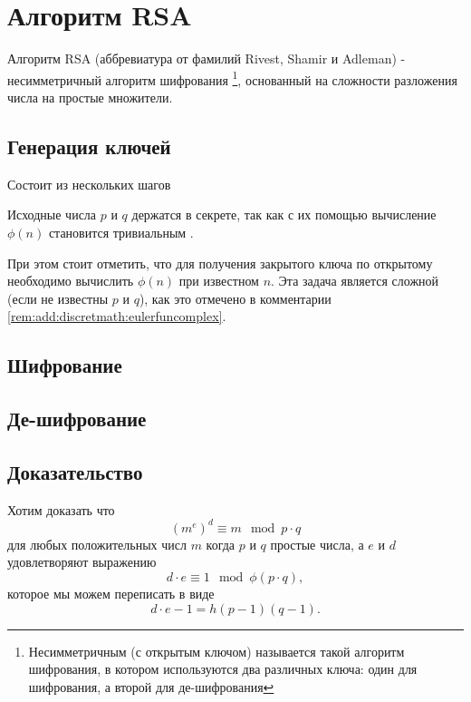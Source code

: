 \section{Алгоритм RSA}
\label{AddRSA}
Алгоритм RSA (аббревиатура от фамилий Rivest, Shamir и Adleman) - 
несимметричный алгоритм шифрования
\footnote{Несимметричным (с открытым ключом) называется такой алгоритм
  шифрования, в 
  котором используются два различных ключа: один для шифрования, а
  второй для де-шифрования},  
основанный на сложности разложения числа на простые множители.  

\subsection{Генерация ключей}
Состоит из нескольких шагов


Исходные числа $p$ и $q$ держатся в секрете, так как с их помощью
вычисление $\phi(n)$ становится тривиальным .

При этом стоит отметить, что для получения закрытого ключа по открытому
необходимо вычислить $\phi(n)$ при известном $n$. Эта задача является
сложной (если не известны $p$ и $q$), как это отмечено в комментарии
\ref{rem:add:discretmath:eulerfuncomplex}. 



\subsection{Шифрование}


\subsection{Де-шифрование}


\subsection{Доказательство}
Хотим доказать что 
\[
\left(m^e\right)^d \equiv m \mod{p \cdot q}
\]
для любых положительных числ $m$ когда $p$ и $q$ простые числа, а $e$
и $d$ удовлетворяют выражению
\[
d \cdot e \equiv 1 \mod{\phi\left(p \cdot q\right)},
\]
которое мы можем переписать в виде
\[
d \cdot e - 1 = h \left(p - 1\right)\left(q - 1\right).
\]

